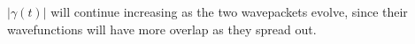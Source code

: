 \begin{sol}
$|\gamma(t)|$ will continue increasing as the two wavepackets evolve, since their wavefunctions will have more overlap as they spread out.
\end{sol}